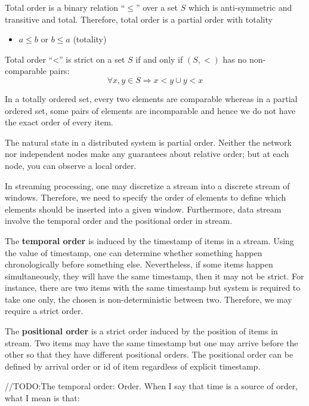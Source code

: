 \begin{defi}
 Total order is a binary relation ``$\leq$'' over a set $S$ which is anti-symmetric and transitive and total. Therefore, total order is a partial order with totality
 
 \begin{itemize}
	 \item $a \leq b$ or $b \leq a$  (totality)
\end{itemize}
\end{defi}

Total order ``<'' is strict on a set $S$ if and only if $(S, <)$ has no non-comparable pairs:
\begin{equation}
 \forall x, y \in S \Rightarrow  x < y \cup y < x 
\end{equation} 

In a totally ordered set, every two elements are comparable whereas in a partial ordered set, some pairs of elements are incomparable and hence we do not have the exact order of every item.

The natural state in a distributed system is partial order. Neither the network nor independent nodes make any guarantees about relative order; but at each node, you can observe a local order.

In streaming processing, one may discretize a stream into a discrete stream of windows. Therefore, we need to specify the order of elements to define which elements should be inserted into a given window. Furthermore, data stream involve the temporal order and the positional order \citep{Petit:2012} in stream. 

The \textbf{temporal order} is induced by the timestamp of items in a stream. Using the value of timestamp, one can determine whether something happen chronologically before something else. Nevertheless, if some items happen simultaneously, they will have the same timestamp, then it may not be strict. For instance, there are two items with the same timestamp but system is required to take one only, the chosen is non-deterministic between two. Therefore, we may require a strict order.

The \textbf{positional order} is a strict order induced by the position of items in stream. Two items  may have the same timestamp but one may arrive before the other so that they have different positional orders. The positional order can be defined by arrival order or id of item regardless of explicit timestamp. 


//TODO:The temporal order: Order. When I say that time is a source of order, what I mean is that:

